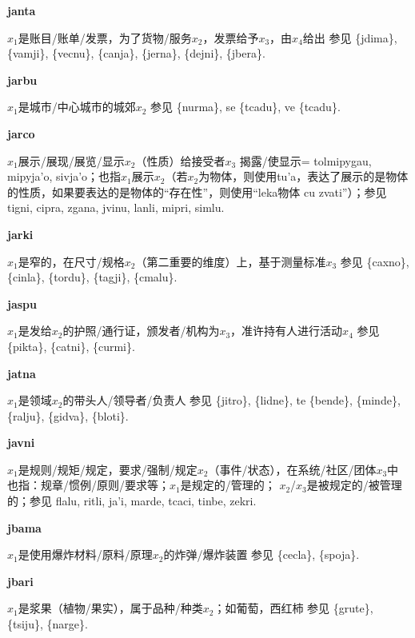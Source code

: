 \documentclass[notitlepage,twocolumn,a4paper,10pt]{book}
\begin{document}
{{\sffamily\bfseries janta}\enspace {\ttfamily\bfseries[jat]}  $x_1$是账目\slash{}账单\slash{}发票，为了货物\slash{}服务$x_2$，发票给予$x_3$，由$x_4$给出 \textemdash{} 参见 \{jdima\}, \{vamji\}, \{vecnu\}, \{canja\}, \{jerna\}, \{dejni\}, \{jbera\}.

{\sffamily\bfseries jarbu} $x_1$是城市\slash{}中心城市的城郊$x_2$ \textemdash{} 参见 \{nurma\}, se \{tcadu\}, ve \{tcadu\}.

{\sffamily\bfseries jarco}\enspace {\ttfamily\bfseries[        ja'o]}  $x_1$展示\slash{}展现\slash{}展览\slash{}显示$x_2$（性质）给接受者$x_3$ \textemdash{} 揭露\slash{}使显示= {tolmipygau}, {mipyja'o}, {sivja'o}；也指$x_1$展示$x_2$（若$x_2$为物体，则使用{tu'a}，表达了展示的是物体的性质，如果要表达的是物体的“存在性”，则使用“{leka}物体 {cu} {zvati}”）；参见 {tigni}, {cipra}, {zgana}, {jvinu}, {lanli}, {mipri}, {simlu}.

{\sffamily\bfseries jarki}\enspace {\ttfamily\bfseries[jak]}  $x_1$是窄的，在尺寸\slash{}规格$x_2$（第二重要的维度）上，基于测量标准$x_3$ \textemdash{} 参见 \{caxno\}, \{cinla\}, \{tordu\}, \{tagji\}, \{cmalu\}.

{\sffamily\bfseries jaspu}\enspace {\ttfamily\bfseries[jap]}  $x_1$是发给$x_2$的护照\slash{}通行证，颁发者\slash{}机构为$x_3$，准许持有人进行活动$x_4$ \textemdash{} 参见 \{pikta\}, \{catni\}, \{curmi\}.

{\sffamily\bfseries jatna}\enspace {\ttfamily\bfseries[        ja'a]}  $x_1$是领域$x_2$的带头人\slash{}领导者\slash{}负责人 \textemdash{} 参见 \{jitro\}, \{lidne\}, te \{bende\}, \{minde\}, \{ralju\}, \{gidva\}, \{bloti\}.

{\sffamily\bfseries javni}\enspace {\ttfamily\bfseries[    jva]}  $x_1$是规则\slash{}规矩\slash{}规定，要求\slash{}强制\slash{}规定$x_2$（事件\slash{}状态），在系统\slash{}社区\slash{}团体$x_3$中 \textemdash{} 也指：规章\slash{}惯例\slash{}原则\slash{}要求等；$x_1$是规定的\slash{}管理的； $x_2$\slash{}$x_3$是被规定的\slash{}被管理的；参见 {flalu}, {ritli}, {ja'i}, {marde}, {tcaci}, {tinbe}, {zekri}.

{\sffamily\bfseries jbama}\enspace {\ttfamily\bfseries[bam]}  $x_1$是使用爆炸材料\slash{}原料\slash{}原理$x_2$的炸弹\slash{}爆炸装置 \textemdash{} 参见 \{cecla\}, \{spoja\}.

{\sffamily\bfseries jbari}\enspace {\ttfamily\bfseries[    jba]}  $x_1$是浆果（植物\slash{}果实），属于品种\slash{}种类$x_2$；如葡萄，西红柿 \textemdash{} 参见 \{grute\}, \{tsiju\}, \{narge\}.

}
\end{document}
